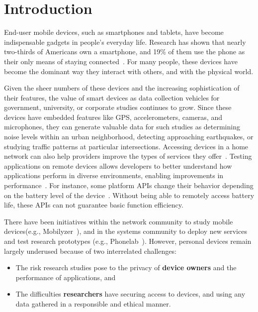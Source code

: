 \section{Introduction}

End-user mobile devices, such as smartphones and tablets, have become
indispensable gadgets in people's everyday life. %
Research has shown that nearly two-thirds of
Americans own a smartphone, and 19\% of them
use the phone as their only means of staying connected~\cite{phone2015}. 
For many people, these devices have become the dominant way they
interact with others, and with the physical world.

Given the sheer numbers of these devices and the increasing
sophistication of their features,
the value of smart devices as data collection vehicles for government,
university, or corporate studies continues to grow. Since
these devices have embedded features like GPS,
accelerometers, cameras, and microphones, they can generate valuable
data for such studies as determining noise levels within an urban
neighborhood, detecting approaching earthquakes, or studying traffic
patterns at particular intersections. Accessing devices in a home
network can also help providers improve the types of services they 
offer~\cite{sundaresan2011broadband}. Testing applications on remote
devices allows developers to better understand how applications 
perform in diverse environments, enabling improvements in 
performance~\cite{ravindranath2012appinsight}. For instance, 
some platform APIs change their behavior depending 
on the battery level of the device~\cite{battery}. Without being able to remotely access battery life, these APIs can not guarantee basic function efficiency.

There have been initiatives within the network
community to study mobile devices(e.g.,
Mobilyzer~\cite{nikravesh2015mobilyzer}), and in the systems community
to deploy new services and test research prototypes (e.g.,
Phonelab~\cite{phonelab, nandugudi2013phonelab}). However, personal devices
remain largely underused because of two interrelated challenges:

\begin{itemize}\setlength\itemsep{0em}
\item The risk research studies pose to the privacy of \textbf{device 
owners} and the performance of applications, and 

\item The difficulties \textbf{researchers} have
securing access to devices, and using any data gathered in a
responsible and ethical manner. 
\end{itemize}
					
